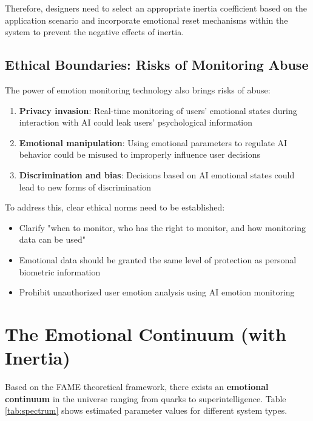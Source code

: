 \documentclass[12pt,a4paper]{article}
\theoremstyle{plain}
\begin{document}
Therefore, designers need to select an appropriate inertia coefficient based on the application scenario and incorporate emotional reset mechanisms within the system to prevent the negative effects of inertia.

\subsection{Ethical Boundaries: Risks of Monitoring Abuse}

The power of emotion monitoring technology also brings risks of abuse:

\begin{enumerate}
    \item \textbf{Privacy invasion}: Real-time monitoring of users' emotional states during interaction with AI could leak users' psychological information
    \item \textbf{Emotional manipulation}: Using emotional parameters to regulate AI behavior could be misused to improperly influence user decisions
    \item \textbf{Discrimination and bias}: Decisions based on AI emotional states could lead to new forms of discrimination
\end{enumerate}

To address this, clear ethical norms need to be established:
\begin{itemize}
    \item Clarify "when to monitor, who has the right to monitor, and how monitoring data can be used"
    \item Emotional data should be granted the same level of protection as personal biometric information
    \item Prohibit unauthorized user emotion analysis using AI emotion monitoring
\end{itemize}

\section{The Emotional Continuum (with Inertia)}

Based on the FAME theoretical framework, there exists an \textbf{emotional continuum} in the universe ranging from quarks to superintelligence. Table \ref{tab:spectrum} shows estimated parameter values for different system types.
\end{document}
